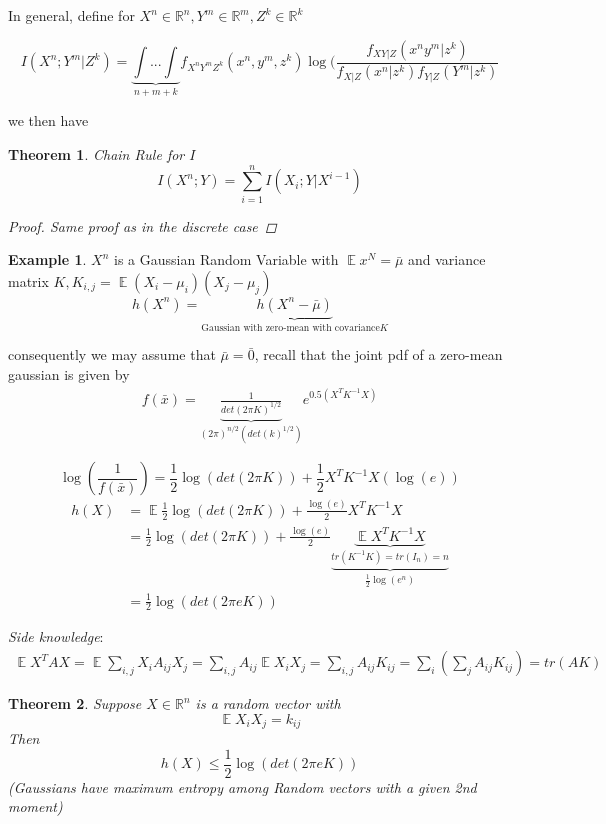 \documentclass{article}
\newtheorem{theorem}{Theorem}[section]
\theoremstyle{definition} %
\newtheorem{example}{Example}
\def\R{\mathbb{R}}
\DeclareMathOperator{\E}{\mathbb{E}}%
\begin{document}
In general, define for $X^n \in \R^n, Y^m \in \R^m, Z^k \in \R^k$

\[
  I(X^n ; Y^m | Z^k) = \underbrace{\int ... \int}_{n + m + k} f_{X^n Y^m Z^k}(x^n, y^m, z^k) \log(\frac{f_{XY|Z}(x^n y^m | z^k)}{f_{X|Z}(x^n | z^k) f_{Y|Z}(Y^m | z^k)}
\]

we then have

\begin{theorem}{Chain Rule for $I$}
  \[
    I(X^n ; Y) = \sum_{i = 1}^n I(X_i ; Y | X^{i - 1})
  \]
  \begin{proof}
    Same proof as in the discrete case
  \end{proof}
\end{theorem}

\begin{example}
  $X^n$ is a Gaussian Random Variable with $\E{x^N} = \bar{\mu}$ and variance matrix $K, K_{i,j} = \E{(X_i - \mu _i)(X_j - \mu_j)}$
  \[
    h(X^n) = \underbrace{h(X^n - \bar{\mu})}_{\text{Gaussian with zero-mean with covariance} K}
  \]

  consequently we may assume that $\bar{\mu} = \bar{0}$, recall that the joint pdf of a zero-mean gaussian is given by
  \begin{align*}
    f(\bar{x}) = \underbrace{\frac{1}{det(2 \pi K)^{1/2}}}_{(2 \pi)^{n/2} (det(k)^{1/2})} e^{0.5 (X^T K^{-1} X)}
  \end{align*}

  \[
    \log(\frac{1}{f(\bar{x})}) = \frac{1}{2} \log(det(2 \pi K)) + \frac{1}{2} X^T K^{-1} X(\log(e))
  \]
  \begin{align*}
    h(X) &= \E{\frac{1}{2} \log(det(2 \pi K)) + \frac{\log(e)}{2} X^T K^{-1} X } \\
    &= \frac{1}{2} \log(det(2 \pi K)) + \frac{\log(e)}{2} \underbrace{\underbrace{\E{X^T K^{-1} X}}_{tr(K^{-1}K) = tr(I_n) = n}}_{\frac{1}{2} \log(e^n)} \\
    &= \frac{1}{2} \log(det(2 \pi e K))
  \end{align*}

  \textit{Side knowledge}:
  \begin{align*}
    \E{X^T A X} = \E{\sum_{i,j} X_i A_{ij} X_j} = \sum_{i, j} A_{ij} \E{X_i X_j}
    = \sum_{i,j} A_{ij} K_{ij} = \sum_i (\sum_j A_{ij} K_{ij}) = tr(AK)
  \end{align*}
\end{example}

\begin{theorem}
  Suppose $X \in \R^n$ is a random vector with
  \[
    \E{X_i X_j} = k_{ij}
  \]
  Then
  \[
    h(X) \leq \frac{1}{2} \log(det(2 \pi e K))
  \]
  (Gaussians have maximum entropy among Random vectors with a given 2nd moment)
\end{theorem}
\end{document}
